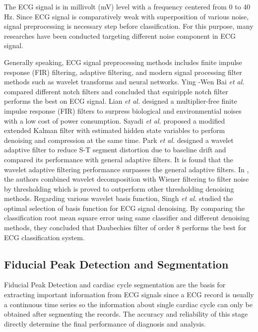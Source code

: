 The ECG signal is in millivolt (mV) level with a frequency centered from 0 to 40 Hz\cite{thakor1984estimation}. Since ECG signal is comparatively weak with superposition of various noise, signal preprocessing is necessary step before classification. For this purpose, many researches have been conducted targeting different noise component in ECG signal.

Generally speaking, ECG signal preprocessing methods includes finite impulse response (FIR) filtering,   adaptive filtering, and modern signal processing filter methods such as wavelet transforms and neural networks. Ying -Wen Bai \textit{et al.} compared different notch filters and concluded that equiripple notch filter performs the best on ECG signal. Lian \textit{et al.} \cite{lian2004ecg} designed a multiplier-free finite impulse response (FIR) filters to surpress biological and environmential noises with a low cost of power consumption. Sayadi \textit{et al.} \cite{Sayadi} proposed a modified extended Kalman filter with estimated hidden state variables to perform denoising and compression at the same time. Park \textit{et al.}\cite{park1998application} designed a wavelet adaptive filter to reduce S-T segment distortion due to baseline drift and compared its performance with general adaptive filters. It is found that the wavelet adaptive filtering performance surpasses the general adaptive filters. In \cite{nikolaev2000wavelet}, the authors combined wavelet decomposition with Wiener filtering to filter noise by thresholding which is proved to outperform other thresholding denoising methods. Regarding various wavelet basis function, Singh \textit{et al.} studied the optimal selection of basis function for ECG signal denoising\cite{denoise}. By comparing the classification root mean square error using same classifier and different denoising methods, they concluded that Daubechies filter of order 8 performs the best for ECG classification system.


\subsection{Fiducial Peak Detection and Segmentation}\label{sec:fiducial_peaks}

Fiducial Peak Detection and cardiac cycle segmentation are the basis for extracting important information from ECG signals since a ECG record is usually a continuous time series so the information about single cardiac cycle can only be obtained after segmenting the records. The accuracy and reliability of this stage directly determine the final performance of diagnosis and analysis. 

